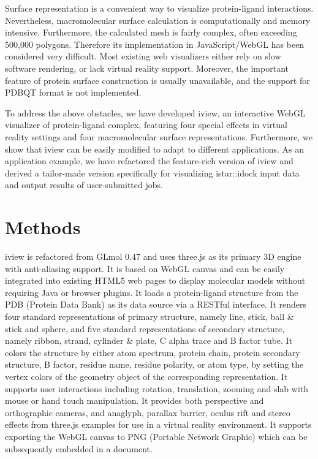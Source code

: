 Surface representation is a convenient way to visualize protein-ligand interactions. Nevertheless, macromolecular surface calculation is computationally and memory intensive. Furthermore, the calculated mesh is fairly complex, often exceeding 500,000 polygons. Therefore its implementation in JavaScript/WebGL has been considered very difficult. Most existing web visualizers either rely on slow software rendering, or lack virtual reality support. Moreover, the important feature of protein surface construction is usually unavailable, and the support for PDBQT format is not implemented.

To address the above obstacles, we have developed iview, an interactive WebGL visualizer of protein-ligand complex, featuring four special effects in virtual reality settings and four macromolecular surface representations. Furthermore, we show that iview can be easily modified to adapt to different applications. As an application example, we have refactored the feature-rich version of iview and derived a tailor-made version specifically for visualizing istar::idock input data and output results of user-submitted jobs.

\section{Methods}

iview is refactored from GLmol 0.47 and uses three.js as its primary 3D engine with anti-aliasing support. It is based on WebGL canvas and can be easily integrated into existing HTML5 web pages to display molecular models without requiring Java or browser plugins. It loads a protein-ligand structure from the PDB (Protein Data Bank) \citep{1357} as its data source via a RESTful interface. It renders four standard representations of primary structure, namely line, stick, ball \& stick and sphere, and five standard representations of secondary structure, namely ribbon, strand, cylinder \& plate, C alpha trace and B factor tube. It colors the structure by either atom spectrum, protein chain, protein secondary structure, B factor, residue name, residue polarity, or atom type, by setting the vertex colors of the geometry object of the corresponding representation. It supports user interactions including rotation, translation, zooming and slab with mouse or hand touch manipulation. It provides both perspective and orthographic cameras, and anaglyph, parallax barrier, oculus rift and stereo effects from three.js examples for use in a virtual reality environment. It supports exporting the WebGL canvas to PNG (Portable Network Graphic) which can be subsequently embedded in a document.

